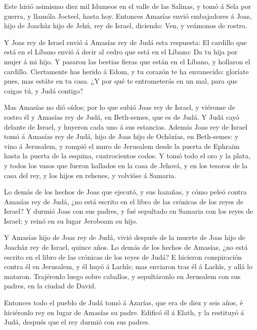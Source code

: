  Este hirió asimismo diez mil Idumeos en el valle de las
Salinas, y tomó á Sela por guerra, y llamóla Jocteel, hasta hoy.
 Entonces Amasías envió embajadores á Joas, hijo de Joachâz
hijo de Jehú, rey de Israel, diciendo: Ven, y veámonos de rostro.

 Y Joas rey de Israel envió á Amasías rey de Judá esta
respuesta: El cardillo que está en el Líbano envió á decir al cedro que
está en el Líbano: Da tu hija por mujer á mi hijo. Y pasaron las bestias
fieras que están en el Líbano, y hollaron el cardillo. 
Ciertamente has herido á Edom, y tu corazón te ha envanecido: gloríate
pues, mas estáte en tu casa. ¿Y por qué te entrometerás en un mal, para
que caigas tú, y Judá contigo?

 Mas Amasías no dió oídos; por lo que subió Joas rey de
Israel, y viéronse de rostro él y Amasías rey de Judá, en Beth-semes,
que es de Judá.  Y Judá cayó delante de Israel, y huyeron
cada uno á sus estancias.  Además Joas rey de Israel tomó á
Amasías rey de Judá, hijo de Joas hijo de Ochôzías, en Beth-semes: y
vino á Jerusalem, y rompió el muro de Jerusalem desde la puerta de
Ephraim hasta la puerta de la esquina, cuatrocientos codos.
 Y tomó todo el oro y la plata, y todos los vasos que
fueron hallados en la casa de Jehová, y en los tesoros de la casa del
rey, y los hijos en rehenes, y volvióse á Samaria.

 Lo demás de los hechos de Joas que ejecutó, y sus hazañas,
y cómo peleó contra Amasías rey de Judá, ¿no está escrito en el libro de
las crónicas de los reyes de Israel?  Y durmió Joas con sus
padres, y fué sepultado en Samaria con los reyes de Israel; y reinó en
su lugar Jeroboam su hijo.

 Y Amasías hijo de Joas rey de Judá, vivió después de la
muerte de Joas hijo de Joachâz rey de Israel, quince años. 
Lo demás de los hechos de Amasías, ¿no está escrito en el libro de las
crónicas de los reyes de Judá?  E hicieron conspiración
contra él en Jerusalem, y él huyó á Lachîs; mas enviaron tras él á
Lachîs, y allá lo mataron.  Trajéronlo luego sobre
caballos, y sepultáronlo en Jerusalem con sus padres, en la ciudad de
David.

 Entonces todo el pueblo de Judá tomó á Azarías, que era de
diez y seis años, é hiciéronlo rey en lugar de Amasías su padre.
 Edificó él á Elath, y la restituyó á Judá, después que el
rey durmió con sus padres.

